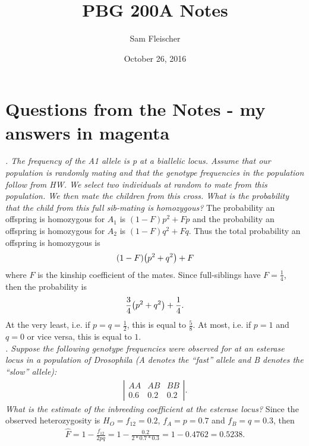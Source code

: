 \documentclass{article}
\title{PBG 200A Notes}
\author{Sam Fleischer}
\date{October 26, 2016}
\begin{document}
    \maketitle

    \section{Questions from the Notes - my answers in {\color{magenta}magenta}}
        
        \emph{. The frequency of the A1 allele is p at a biallelic locus. Assume that our population is randomly mating and that the genotype frequencies in the population follow from HW. We select two individuals at random to mate from this population. We then mate the children from this cross. What is the probability that the child from this full sib-mating is homozygous?}  {\color{magenta} The probability an offspring is homozygous for $A_1$ is $(1 - F)p^2 + Fp$ and the probability an offspring is homozygous for $A_2$ is $(1 - F)q^2 + Fq$.  Thus the total probability an offspring is homozygous is
        \begin{align*}
            (1 - F)\qty(p^2 + q^2) + F
        \end{align*}
        where $F$ is the kinship coefficient of the mates.  Since full-siblings have $F = \frac{1}{4}$, then the probability is
        \begin{align*}
            \frac{3}{4}\qty(p^2 + q^2) + \frac{1}{4}.
        \end{align*}
        At the very least, i.e. if $p = q = \frac{1}{2}$, this is equal to $\frac{5}{8}$.  At most, i.e. if $p = 1$ and $q = 0$ or vice versa, this is equal to $1$.
        } \\

        \emph{. Suppose the following genotype frequencies were observed for at an esterase locus in a population of \emph{Drosophila} (A denotes the ``fast'' allele and B denotes the ``slow'' allele):
        \begin{align*}
            \left|\begin{array}{ccc}
                AA & AB & BB \\ 0.6 & 0.2 & 0.2
            \end{array}\right|.
        \end{align*}
        What is the estimate of the inbreeding coefficient at the esterase locus?}  {\color{magenta} Since the observed heterozygosity is $H_O = f_{12} = 0.2$, $f_A = p = 0.7$ and $f_B = q = 0.3$, then
        \begin{align*}
            \hat{F} = 1 - \frac{f_{12}}{2pq} = 1 - \frac{0.2}{2*0.7*0.3} = 1 - 0.4762 = 0.5238.
        \end{align*}}
\end{document}
